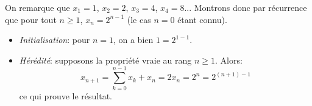 On remarque que $x_1=1$, $x_2=2$, $x_3=4$, $x_4=8$... Montrons donc par récurrence que pour tout $n\geq 1$, $x_n=2^{n-1}$ (le cas $n=0$ étant connu).
\begin{itemize}
  \item \textit{Initialisation}: pour $n=1$, on a bien $1=2^{1-1}$.
  \item \textit{Hérédité}: supposons la propriété vraie au rang $n \geq 1$. Alors:
  \[
  x_{n+1} = \sum_{k=0}^{n-1}{x_k} + x_n = 2x_n = 2^n = 2^{(n+1)-1}
  \] 
  ce qui prouve le résultat.
\end{itemize}
